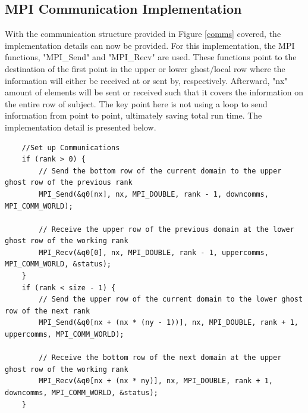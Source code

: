 \documentclass[12pt]{article}
\begin{document}
\subsection{MPI Communication Implementation}
With the communication structure provided in Figure \ref{comms} covered, the implementation details can now be provided. For this implementation, the MPI functions, "MPI\_Send" and "MPI\_Recv" are used. These functions point to the destination of the first point in the upper or lower ghost/local row where the information will either be received at or sent by, respectively. Afterward, "nx" amount of elements will be sent or received such that it covers the information on the entire row of subject. The key point here is not using a loop to send information from point to point, ultimately saving total run time. The implementation detail is presented below.
        \begin{verbatim}
    //Set up Communications
    if (rank > 0) {
        // Send the bottom row of the current domain to the upper ghost row of the previous rank
        MPI_Send(&q0[nx], nx, MPI_DOUBLE, rank - 1, downcomms, MPI_COMM_WORLD);

        // Receive the upper row of the previous domain at the lower ghost row of the working rank
        MPI_Recv(&q0[0], nx, MPI_DOUBLE, rank - 1, uppercomms, MPI_COMM_WORLD, &status);
    }
    if (rank < size - 1) {
        // Send the upper row of the current domain to the lower ghost row of the next rank
        MPI_Send(&q0[nx + (nx * (ny - 1))], nx, MPI_DOUBLE, rank + 1, uppercomms, MPI_COMM_WORLD);

        // Receive the bottom row of the next domain at the upper ghost row of the working rank
        MPI_Recv(&q0[nx + (nx * ny)], nx, MPI_DOUBLE, rank + 1, downcomms, MPI_COMM_WORLD, &status);
    }
    \end{verbatim}
\end{document}
